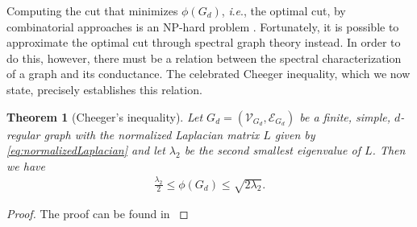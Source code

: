 \documentclass[reqno,8pt]{amsart}
\newtheorem{theorem}{Theorem}
\theoremstyle{definition}
\theoremstyle{remark}
\numberwithin{equation}{section}
\def\cVGD{\mathcal{V}_{G_d}}
\def\cEGD{\mathcal{E}_{G_d}}
\def\GD{G_d=(\cVGD,\cEGD)}
\newcommand{\ie}{\textit{i}.\textit{e}., }
\begin{document}
Computing the cut that minimizes $\phi(G_d)$, \ie the optimal cut, by combinatorial approaches is an NP-hard problem \cite{Garey1990}. Fortunately, it is possible to approximate the optimal cut through spectral graph theory instead. In order to do this, however, there must be a relation between the spectral characterization of a graph and its conductance. The celebrated Cheeger inequality, which we now state, precisely establishes this relation. 
\begin{theorem}[Cheeger's inequality] \label{thrm:cheeger}
Let $\GD$ be a finite, simple, $d$-regular graph with the normalized Laplacian matrix $L$ given by \ref{eq:normalizedLaplacian} and let $\lambda_2$ be the second smallest eigenvalue of $L$. Then we have
\begin{align}\label{eq:cheeger} 
\frac{\lambda_2}{2} \leq \phi(G_d) \leq \sqrt{2 \lambda_2}.	
\end{align}
\end{theorem}
\begin{proof}
The proof can be found in \cite{Chung97}
\end{proof}
\end{document}
